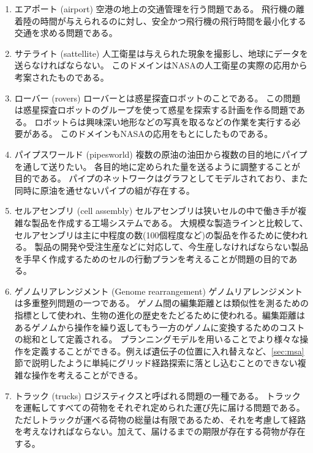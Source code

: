 \begin{enumerate}
\item エアポート (airport)
空港の地上の交通管理を行う問題である。
飛行機の離着陸の時間が与えられるのに対し、安全かつ飛行機の飛行時間を最小化する交通を求める問題である。

\item サテライト (sattellite)
人工衛星は与えられた現象を撮影し、地球にデータを送らなければならない。
このドメインはNASAの人工衛星の実際の応用から考案されたものである。

\item ローバー (rovers)
ローバーとは惑星探査ロボットのことである。
この問題は惑星探査ロボットのグループを使って惑星を探索する計画を作る問題である。
ロボットらは興味深い地形などの写真を取るなどの作業を実行する必要がある。
このドメインもNASAの応用をもとにしたものである。

\item パイプスワールド (pipesworld)
複数の原油の油田から複数の目的地にパイプを通して送りたい。
各目的地に定められた量を送るように調整することが目的である。
パイプのネットワークはグラフとしてモデルされており、また同時に原油を通せないパイプの組が存在する。

\item セルアセンブリ (cell assembly)
セルアセンブリは狭いセルの中で働き手が複雑な製品を作成する工場システムである。
大規模な製造ラインと比較して、
セルアセンブリは主に中程度の数(100個程度など)の製品を作るために使われる。
製品の開発や受注生産などに対応して、今生産しなければならない製品を手早く作成するためのセルの行動プランを考えることが問題の目的である。
\cite{asai2014fully}

\item ゲノムリアレンジメント (Genome rearrangement)
ゲノムリアレンジメントは多重整列問題の一つである。
ゲノム間の編集距離とは類似性を測るための指標として使われ、生物の進化の歴史をたどるために使われる。編集距離はあるゲノムから操作を繰り返してもう一方のゲノムに変換するためのコストの総和として定義される。
プランニングモデルを用いることでより様々な操作を定義することができる。例えば遺伝子の位置に入れ替えなど、\ref{sec:msa}節で説明したように単純にグリッド経路探索に落とし込むことのできない複雑な操作を考えることができる。
\cite{erdem2005genome}

\item トラック (trucks)
ロジスティクスと呼ばれる問題の一種である。
トラックを運転してすべての荷物をそれぞれ定められた運び先に届ける問題である。
ただしトラックが運べる荷物の総量は有限であるため、それを考慮して経路を考えなければならない。加えて、届けるまでの期限が存在する荷物が存在する。

\end{enumerate}


